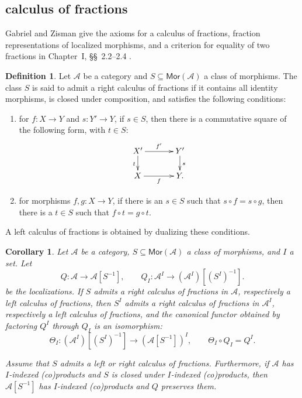 \documentclass[10pt,a4paper]{amsart}
\theoremstyle{plain}
\newtheorem{corollary}[theorem]{Corollary}
\theoremstyle{definition}
\newtheorem{definition}[theorem]{Definition}
\theoremstyle{remark}
\begin{document}
\subsection{calculus of fractions}

Gabriel and Zisman give the axioms for a calculus of fractions, fraction representations of localized morphisms, and a criterion for equality of two fractions in Chapter~I, \S\S~2.2--2.4 \cite[Chapter~I, \S\S~2.2--2.4, pp.~12--14]{GabrielZisman}.

\begin{definition}
  Let $\mathcal{A}$ be a category and $S \subseteq \mathsf{Mor}(\mathcal{A})$ a class of morphisms.
  The class $S$ is said to admit a right calculus of fractions if it contains all identity morphisms, is closed under composition, and satisfies the following conditions:
  \begin{enumerate}[label=\textup{(\arabic*)}]
    \item for $f:X\longrightarrow Y$ and $s:Y'\longrightarrow Y$, if $s\in S$, then there is a commutative square of the following form, with $t\in S$:
          \[
            \xymatrix@C=12mm@R=6mm{
            X'\ar[r]^{f'}\ar[d]_t&Y'\ar[d]^s\\
            X\ar[r]_f&Y.
            }
          \]
    \item for morphisms $f,g:X\longrightarrow Y$, if there is an $s\in S$ such that $s\circ f=s\circ g$, then there is a $t\in S$ such that $f\circ t=g\circ t$.
  \end{enumerate}
  A left calculus of fractions is obtained by dualizing these conditions.
\end{definition}

\begin{corollary}\label{thm:fraction-calculus-application}
  Let $\mathcal A$ be a category, $S\subseteq\mathsf{Mor}(\mathcal A)$ a class of morphisms, and $I$ a set.
  Let
  \[
    Q:\mathcal A\longrightarrow\mathcal A[S^{-1}],
    \qquad
    Q_I:\mathcal A^I\longrightarrow
    (\mathcal A^I)[(S^I)^{-1}].
  \]
  be the localizations.
  If $S$ admits a right calculus of fractions in $\mathcal{A}$, respectively a left calculus of fractions, then $S^I$ admits a right calculus of fractions in $\mathcal A^I$, respectively a left calculus of fractions, and the canonical functor obtained by factoring $Q^I$ through $Q_I$ is an isomorphism:
  \[
    \Theta_I:
    (\mathcal A^I)[(S^I)^{-1}]
    \longrightarrow(\mathcal A[S^{-1}])^I,
    \qquad
    \Theta_I\circ Q_I=Q^I.
  \]

  Assume that $S$ admits a left or right calculus of fractions.
  Furthermore, if $\mathcal A$ has $I$-indexed (co)products and $S$ is closed under $I$-indexed (co)products, then $\mathcal A[S^{-1}]$ has $I$-indexed (co)products and $Q$ preserves them.
\end{corollary}
\end{document}
